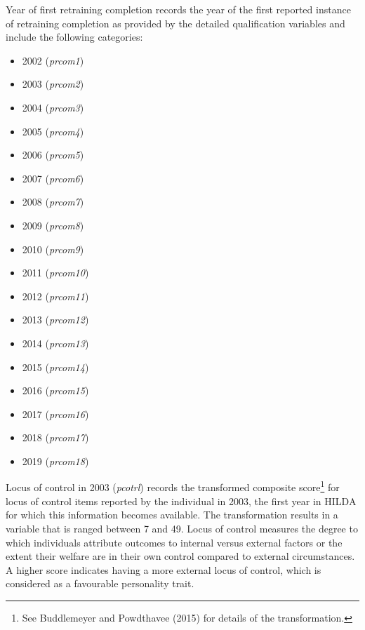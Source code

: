 \documentclass[12pt, a4paper]{article}
\begin{document}
Year of first retraining completion records the year of the first reported instance of retraining completion as provided by the detailed qualification variables and include the following categories:
\begin{itemize}
  \item 2002 (\textit{p\textunderscore{}rcom1})
  \item 2003 (\textit{p\textunderscore{}rcom2})
  \item 2004 (\textit{p\textunderscore{}rcom3})
  \item 2005 (\textit{p\textunderscore{}rcom4})
  \item 2006 (\textit{p\textunderscore{}rcom5})
  \item 2007 (\textit{p\textunderscore{}rcom6})
  \item 2008 (\textit{p\textunderscore{}rcom7})
  \item 2009 (\textit{p\textunderscore{}rcom8})
  \item 2010 (\textit{p\textunderscore{}rcom9})
  \item 2011 (\textit{p\textunderscore{}rcom10})
  \item 2012 (\textit{p\textunderscore{}rcom11})
  \item 2013 (\textit{p\textunderscore{}rcom12})
  \item 2014 (\textit{p\textunderscore{}rcom13})
  \item 2015 (\textit{p\textunderscore{}rcom14})
  \item 2016 (\textit{p\textunderscore{}rcom15})
  \item 2017 (\textit{p\textunderscore{}rcom16})
  \item 2018 (\textit{p\textunderscore{}rcom17})
  \item 2019 (\textit{p\textunderscore{}rcom18})
\end{itemize}  
  
Locus of control in 2003 (\textit{p\textunderscore{}cotrl}) records the transformed composite score\footnote{See Buddlemeyer and Powdthavee (2015) for details of the transformation.} for locus of control items reported by the individual in 2003, the first year in HILDA for which this information becomes available. The transformation results in a variable that is ranged between 7 and 49. Locus of control measures the degree to which individuals attribute outcomes to internal versus external factors or the extent their welfare are in their own control compared to external circumstances. A higher score indicates having a more external locus of control, which is considered as a favourable personality trait. 
\end{document}
